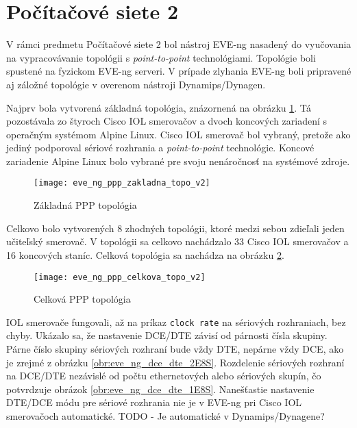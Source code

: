 \section{Počítačové siete 2}

V rámci predmetu Počítačové siete 2 bol nástroj EVE-ng nasadený do vyučovania na vypracovávanie topológii s \emph{point-to-point} technológiami. Topológie boli spustené na fyzickom EVE-ng serveri. V prípade zlyhania EVE-ng boli pripravené aj záložné topológie v overenom nástroji Dynamips/Dynagen.

Najprv bola vytvorená základná topológia, znázornená na obrázku \ref{obr:eve_ng_ppp_zakladna_topo_v2}. Tá pozostávala zo štyroch Cisco IOL smerovačov a dvoch koncových zariadení s operačným systémom Alpine Linux. Cisco IOL smerovač bol vybraný, pretože ako jediný podporoval sériové rozhrania a \emph{point-to-point} technológie. Koncové zariadenie Alpine Linux bolo vybrané pre svoju nenáročnosť na systémové zdroje.

\begin{figure}
    \centering
    \texttt{[image: eve\_ng\_ppp\_zakladna\_topo\_v2]}
    \caption{Základná PPP topológia}
    \label{obr:eve_ng_ppp_zakladna_topo_v2}
\end{figure}

Celkovo bolo vytvorených 8 zhodných topológii, ktoré medzi sebou zdieľali jeden učiteľský smerovač. V topológii sa celkovo nachádzalo 33 Cisco IOL smerovačov a 16 koncových staníc. Celková topológia sa nachádza na obrázku \ref{obr:eve_ng_ppp_celkova_topo_v2}.

\begin{figure}
    \centering
    \texttt{[image: eve\_ng\_ppp\_celkova\_topo\_v2]}
    \caption{Celková PPP topológia}
    \label{obr:eve_ng_ppp_celkova_topo_v2}
\end{figure}

IOL smerovače fungovali, až na príkaz \texttt{clock rate} na sériových rozhraniach, bez chyby. Ukázalo sa, že nastavenie DCE/DTE závisí od párnosti čísla skupiny. Párne číslo skupiny sériových rozhraní bude vždy DTE, nepárne vždy DCE, ako je zrejmé z obrázku \ref{obr:eve_ng_dce_dte_2E8S}. Rozdelenie sériových rozhraní na DCE/DTE nezávislé od počtu ethernetových alebo sériových skupín, čo potvrdzuje obrázok \ref{obr:eve_ng_dce_dte_1E8S}. Nanešťastie nastavenie DTE/DCE módu pre sériové rozhrania nie je v EVE-ng pri Cisco IOL smerovačoch automatické. {\huge TODO - Je automatické v Dynamips/Dynagene?}


